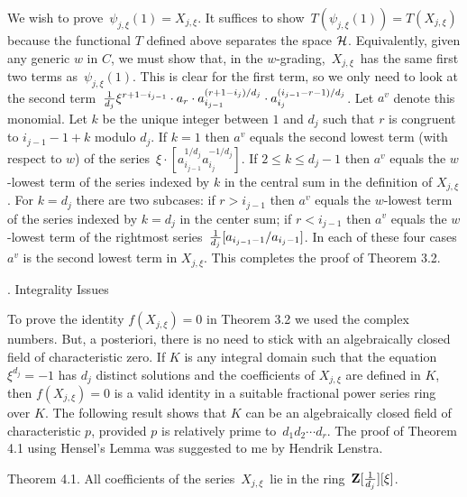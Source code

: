 We wish to prove $\,\psi_{j,\xi}(1) = X_{j,\xi}$. It suffices 
to show $\, T(\psi_{j,\xi}(1)) = T(X_{j,\xi})\,$ because the 
functional $T$ defined above separates the space ${\cal H}$.
Equivalently, given any generic $w$ in $C$, we must show that,
in the $w$-grading, $\,X_{j,\xi}\,$ has the same first two terms as
$\,\psi_{j,\xi}(1)$. This is clear for the first term, so we only need
to look at the second term
$ \, {1 \over d_j} \xi^{ r + 1 - i_{j-1} } \cdot
a_r \cdot a_{i_{j-1}}^{(r+1-i_j)/d_j} \cdot a_{i_j}^{(i_{j-1}-r-1)/d_j} $.
Let $a^v$ denote this monomial.
Let $k $ be the unique integer between $1$ and $d_j$
such that $r$ is congruent to $i_{j-1} - 1 + k$ modulo $d_j$.
If $k = 1$ then $a^v$ equals the second lowest term 
(with respect to $w$) of the 
series $\,\xi \cdot [ a_{i_{j-1}}^{1/d_j} a_{i_{j}}^{-1/d_j} ]$.
If $2 \leq k \leq d_j -1$ then $a^v$ equals
the $w$-lowest term of the series indexed by $k$
in the central sum in the definition of $X_{j,\xi}$.
For $k= d_j$ there are two subcases:
if $ r > i_{j-1} $  then $a^v$ equals
the $w$-lowest term of the series indexed by $k = d_j$
in the center sum; if $r < i_{j-1}$ then $a^v$ equals
the $w$-lowest term of the rightmost series 
$\,{1 \over d_j} [ a_{i_{j-1}-1} / a_{i_j-1}]$.
In each of these four cases  $a^v$ is the second lowest term
in $X_{j,\xi}$. This completes the proof of Theorem 3.2. \Box

. Integrality Issues

To prove the identity $f(X_{j,\xi}) = 0$
in Theorem 3.2 we used the complex numbers.
But, a posteriori, there is no need to stick with
an algebraically closed field of characteristic zero.
If $K$ is any integral domain such that the equation
$\xi^{d_j}=-1$ has $d_j$ distinct solutions
and the coefficients of $X_{j,\xi}$ are defined in $K$,
then $f(X_{j,\xi}) = 0$ is a valid identity in a
suitable fractional power series ring over $K$.
The following result shows that $K$ can be
an algebraically closed field of characteristic $p$,
provided $p$ is relatively prime to $\,d_1 d_2 \cdots d_r $.
The proof of Theorem 4.1 using Hensel's Lemma
was suggested to me by Hendrik Lenstra.

\proclaim Theorem 4.1. All coefficients of the
series $\,X_{j,\xi} \,$ lie in the ring
$\,{\bf Z}[ {1 \over d_j} ][ \xi ]$.

